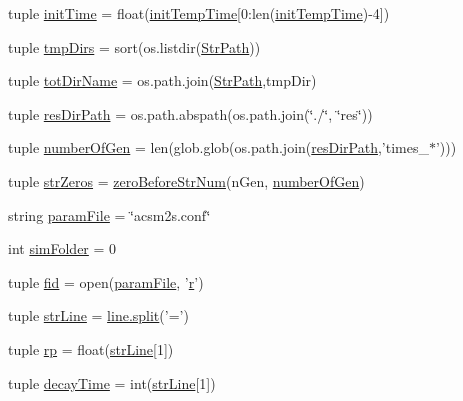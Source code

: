 \begin{DoxyCompactItemize}
\item 
tuple \hyperlink{a00102_a826c1b0585b4e8474c76f92bd7583836}{init\-Time} = float(\hyperlink{a00102_adc4403c4cfe080918c8b9da692c50509}{init\-Temp\-Time}\mbox{[}0\-:len(\hyperlink{a00102_adc4403c4cfe080918c8b9da692c50509}{init\-Temp\-Time})-\/4\mbox{]})
\item 
tuple \hyperlink{a00102_ace4c571efd2e5ecd266ce5701f761a83}{tmp\-Dirs} = sort(os.\-listdir(\hyperlink{a00102_af8add8b37a9c8a7825c0e8f0e7dfd6c1}{Str\-Path}))
\item 
tuple \hyperlink{a00102_a5903034df3d32525785e697152efbeb3}{tot\-Dir\-Name} = os.\-path.\-join(\hyperlink{a00102_af8add8b37a9c8a7825c0e8f0e7dfd6c1}{Str\-Path},tmp\-Dir)
\item 
tuple \hyperlink{a00102_a9ededb3cd7c63befde39ad68e5f9e006}{res\-Dir\-Path} = os.\-path.\-abspath(os.\-path.\-join(\char`\"{}./\char`\"{}, \char`\"{}res\char`\"{}))
\item 
tuple \hyperlink{a00102_a9a81829f850e2e125e3c94214da7a1f0}{number\-Of\-Gen} = len(glob.\-glob(os.\-path.\-join(\hyperlink{a00102_a9ededb3cd7c63befde39ad68e5f9e006}{res\-Dir\-Path},'times\-\_\-$\ast$')))
\item 
tuple \hyperlink{a00102_a8ba6aefb71b3d1e575eac38627f143d6}{str\-Zeros} = \hyperlink{a00102_ab46df2a2027edcf1b07fc012b691b9d6}{zero\-Before\-Str\-Num}(n\-Gen, \hyperlink{a00102_a9a81829f850e2e125e3c94214da7a1f0}{number\-Of\-Gen})
\item 
string \hyperlink{a00102_a7160f8e48b4aafebbd75e9037fc9fef7}{param\-File} = \char`\"{}acsm2s.\-conf\char`\"{}
\item 
int \hyperlink{a00102_a58095f64afeda893517e81226e1963c3}{sim\-Folder} = 0
\item 
tuple \hyperlink{a00102_a424e2204e89264a827e6cad861ebcbc1}{fid} = open(\hyperlink{a00102_a7160f8e48b4aafebbd75e9037fc9fef7}{param\-File}, '\hyperlink{a00031_ac862e7284527eb913b1351c8bfb8e079}{r}')
\item 
tuple \hyperlink{a00102_a072631e11db72789389935b0f9efff8d}{str\-Line} = \hyperlink{a00076_a4d1aa74fac80ae0275c056575fdb6626}{line.\-split}('=')
\item 
tuple \hyperlink{a00102_a98150f532e09ebae495212500d2f1799}{rp} = float(\hyperlink{a00102_a072631e11db72789389935b0f9efff8d}{str\-Line}\mbox{[}1\mbox{]})
\item 
tuple \hyperlink{a00102_a80a6d3cf3f4ccdc596054300761972a9}{decay\-Time} = int(\hyperlink{a00102_a072631e11db72789389935b0f9efff8d}{str\-Line}\mbox{[}1\mbox{]})
\item 

\end{DoxyCompactItemize}
